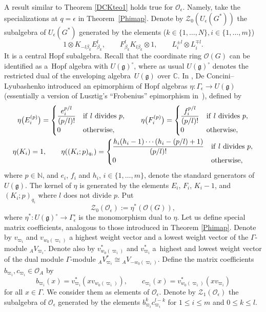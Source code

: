 \documentclass[pdftex]{sigma}
\numberwithin{equation}{section}
\theoremstyle{definition}
\newcommand{\e}{\epsilon}
\newcommand{\mc}{\mathbb{C}}
\newcommand{\mn}{\mathbb{N}}
\newcommand{\Oo}{{\mathcal O}}
\newcommand{\ra}{\rightarrow}
\begin{document}
A result similar to Theorem \ref{DCKteo1} holds true for $\Oo_\e$. Namely, take the specializations at $q=\e$ in Theorem~\ref{Phimap}. Denote by $\mathcal{Z}_0(U_\e(G^*))$ the subalgebra of $U_\e(G^*)$ generated by the elements ($k\in \{1,\dots, N\}, i\in \{1,\dots, m\}$)
\[1\otimes K_{-l \beta_k}E_{\beta_k}^l ,\qquad F_{\beta_k}^l K_{l\beta_k}\otimes 1,\qquad L_i^{\pm l}\otimes L_i^{\mp l}.\]
It is a central Hopf subalgebra. Recall that the coordinate ring $\Oo(G)$ can be identified as a~Hopf algebra with $U(\mathfrak{g})^\circ$, where as usual $U(\mathfrak{g})^\circ$ denotes the restricted dual of the enveloping algebra~$U(\mathfrak{g})$ over $\mc$. In \cite[Section 6]{DC-L}, De Concini--Lyubashenko introduced an epimorphism of Hopf algebras $\eta\colon\Gamma_\e\ra U(\mathfrak{g})$ (essentially a version of Lusztig's ``Frobenius'' epimorphism in~\cite{Lusztig2}), defined by
\begin{gather}
 \eta\big(E_i^{(p)}\big) = \begin{cases} \dfrac{e_i^{p/l}}{(p/l)!} & {\rm if}\ l \ {\rm divides}\ p,\\ 0 & {\rm otherwise},\end{cases} \qquad \eta\big(F_i^{(p)}\big) = \begin{cases} \dfrac{f_i^{p/l}}{(p/l)!} & {\rm if}\ l \ {\rm divides}\ p,\\ 0 & {\rm otherwise},\end{cases} \nonumber\\
 \eta(K_i)=1 , \qquad \eta((K_i;p)_{q_i}) = \begin{cases} \dfrac{h_i(h_i-1)\cdots (h_i-(p/l)+1)}{(p/l)!} & {\rm if}\ l \ {\rm divides}\ p,\\ 0 & {\rm otherwise},\end{cases}\label{etadef}
\end{gather}
where $p\in \mn$, and $e_i$, $f_i$ and $h_i$, $i\in \{1,\dots,m\}$, denote the standard generators of $U(\mathfrak{g})$. The kernel of $\eta$ is generated by the elements $E_i$, $F_i$, $K_i-1$, and $(K_i;p)_{q_i}$ where $l$ does not divide $p$. Put
\begin{equation}\label{Z0Odef}
\mathcal{Z}_0(\Oo_\e) := \eta^*(\Oo(G)),
\end{equation}
where $\eta^*\colon U(\mathfrak{g})^\circ \ra \Gamma_\e^\circ$ is the monomorphism dual to $\eta$. Let us define special matrix coefficients, analogous to those introduced in Theorem \ref{Phimap}. Denote by $v_{\varpi_i}$ and $v_{w_0(\varpi_i)}$ a highest weight vector and a lowest weight vector of the $\Gamma$-module ${}_AV_{\varpi_i}$. Denote also by $v_{w_0(\varpi_i)}^*$ and $v_{\varpi_i}^*$ a~highest and lowest weight vector of the dual module $\Gamma$-module ${}_AV_{\varpi_i}^* \cong {}_AV_{-w_0(\varpi_i)}$. Define the matrix coefficients $b_{\varpi_i}, c_{\varpi_i}\in \Oo_A$ by
\[b_{\varpi_i}(x) = v_{\varpi_i}^*(xv_{w_0(\varpi_i)}) ,\qquad c_{\varpi_i}(x) = v_{w_0(\varpi_i)}^*(xv_{\varpi_i})\]
for all $x\in \Gamma$. We consider them as elements of $\Oo_\e$. Denote by $\mathcal{Z}_1(\Oo_\e)$ the subalgebra of $\Oo_\e$ generated by the elements $b_{\varpi_i}^kc_{\varpi_i}^{l-k}$ for
$1 \leq i\leq m$ and $0\leq k\leq l$.
\end{document}
